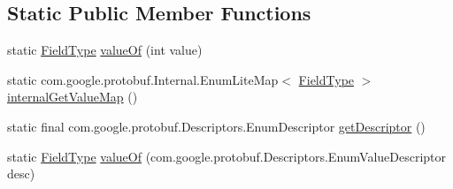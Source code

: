 \subsection*{Static Public Member Functions}
\begin{DoxyCompactItemize}
\item 
static \mbox{\hyperlink{enumcom_1_1mysql_1_1cj_1_1x_1_1protobuf_1_1_mysqlx_resultset_1_1_column_meta_data_1_1_field_type}{Field\+Type}} \mbox{\hyperlink{enumcom_1_1mysql_1_1cj_1_1x_1_1protobuf_1_1_mysqlx_resultset_1_1_column_meta_data_1_1_field_type_acadb44789bcba3de3d78eee3402b7de9}{value\+Of}} (int value)
\item 
static com.\+google.\+protobuf.\+Internal.\+Enum\+Lite\+Map$<$ \mbox{\hyperlink{enumcom_1_1mysql_1_1cj_1_1x_1_1protobuf_1_1_mysqlx_resultset_1_1_column_meta_data_1_1_field_type}{Field\+Type}} $>$ \mbox{\hyperlink{enumcom_1_1mysql_1_1cj_1_1x_1_1protobuf_1_1_mysqlx_resultset_1_1_column_meta_data_1_1_field_type_aad12eb65faefdf3d9a306a54450aab70}{internal\+Get\+Value\+Map}} ()
\item 
static final com.\+google.\+protobuf.\+Descriptors.\+Enum\+Descriptor \mbox{\hyperlink{enumcom_1_1mysql_1_1cj_1_1x_1_1protobuf_1_1_mysqlx_resultset_1_1_column_meta_data_1_1_field_type_adb82dc481c0cb2f8987a18b0618b610b}{get\+Descriptor}} ()
\item 
static \mbox{\hyperlink{enumcom_1_1mysql_1_1cj_1_1x_1_1protobuf_1_1_mysqlx_resultset_1_1_column_meta_data_1_1_field_type}{Field\+Type}} \mbox{\hyperlink{enumcom_1_1mysql_1_1cj_1_1x_1_1protobuf_1_1_mysqlx_resultset_1_1_column_meta_data_1_1_field_type_ada318b207cf853a321d68c51c47f6936}{value\+Of}} (com.\+google.\+protobuf.\+Descriptors.\+Enum\+Value\+Descriptor desc)
\end{DoxyCompactItemize}
